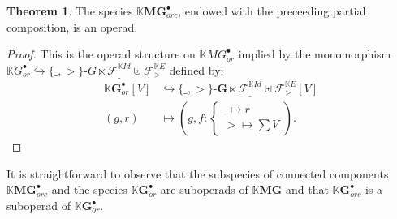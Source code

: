 \documentclass[a4paper]{article}
\theoremstyle{definition}
\newtheorem{theorem}[definition]{Theorem}
\newcommand{\K}{\mathbb{K}}
\newcommand{\MG}{\mathbf{MG}}
\newcommand{\G}{\mathbf{G}}
\begin{document}
\begin{theorem}
    The species $\K \MG_{orc}^\bullet$, endowed with the preceeding partial
    composition, is an operad.
\end{theorem}

\begin{proof}
This is the operad structure on $\K MG_{or}^{\bullet}$ implied by the monomorphism
$\K G_{or}^{\bullet} \hookrightarrow \{\_,>\} \text{-}G\ltimes\mathcal{F}_{\_}^{\K Id}\uplus\mathcal{F}_{>}^{\K E}$ 
defined by:
\begin{equation}\begin{split}
	\K \G_{or}^{\bullet}[V] &\hookrightarrow \{\_,>\}\text{-}\G\ltimes\mathcal{F}_{\_}^{\K Id}\uplus\mathcal{F}_{>}^{\K E}[V] \\
	(g,r) &\mapsto (g,f:\left\{\begin{array}{l}
	\_ \mapsto r \\
	> \mapsto \sum V\end{array}\right.).
\end{split}\end{equation}
\end{proof}

It is straightforward to observe that the subspecies of connected components $\K \MG^{\bullet}_{orc}$ 
and the species $\K \G^{\bullet}_{or}$ are suboperads of $\K \MG$ and that $\K \G^{\bullet}_{orc}$ is a 
suboperad of $\K \G^{\bullet}_{or}$. 
\end{document}
